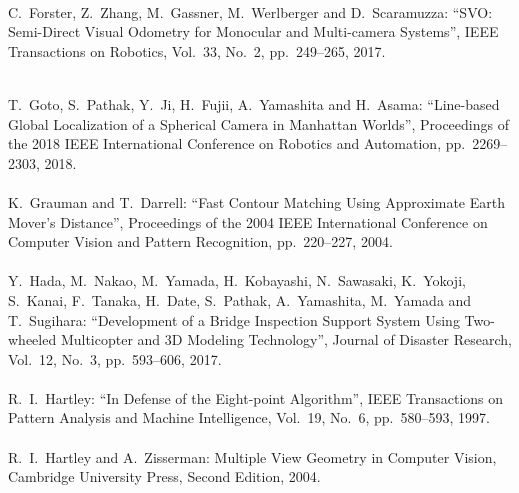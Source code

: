 \begin{mythebibliography}{}
\leavevmode \\C.~Forster, Z.~Zhang, M.~Gassner, M.~Werlberger and D.~Scaramuzza:
\newblock ``SVO: Semi-Direct Visual Odometry for Monocular and Multi-camera Systems'',
\newblock IEEE Transactions on Robotics, Vol.~33, No.~2, pp.~249--265, 2017.
\\


\newpage

\leavevmode \\T.~Goto, S.~Pathak, Y.~Ji, H.~Fujii, A.~Yamashita and H.~Asama:
\newblock ``Line-based Global Localization of a Spherical Camera in Manhattan Worlds'',
\newblock Proceedings of the 2018 IEEE International Conference on Robotics and Automation, pp.~2269--2303, 2018.
\\

\leavevmode \\K.~Grauman and T.~Darrell:
\newblock ``Fast Contour Matching Using Approximate Earth Mover's Distance'',
\newblock Proceedings of the 2004 IEEE International Conference on Computer Vision and Pattern Recognition, pp.~220--227, 2004.
\\

\leavevmode \\Y.~Hada, M.~Nakao, M.~Yamada, H.~Kobayashi, N.~Sawasaki, K.~Yokoji, S.~Kanai, F.~Tanaka, H.~Date, S.~Pathak, A.~Yamashita, M.~Yamada and T.~Sugihara:
\newblock ``Development of a Bridge Inspection Support System Using Two-wheeled Multicopter and 3D Modeling Technology'',
\newblock Journal of Disaster Research, Vol.~12, No.~3, pp.~593--606, 2017.
\\

\leavevmode \\R.~I.~Hartley:
\newblock ``In Defense of the Eight-point Algorithm'',
\newblock IEEE Transactions on Pattern Analysis and Machine Intelligence, Vol.~19, No.~6, pp.~580--593, 1997.
\\


\leavevmode \\R.~I.~Hartley and A.~Zisserman:
\newblock Multiple View Geometry in Computer Vision,
\newblock Cambridge University Press, Second Edition, 2004.
\\


\end{mythebibliography}
